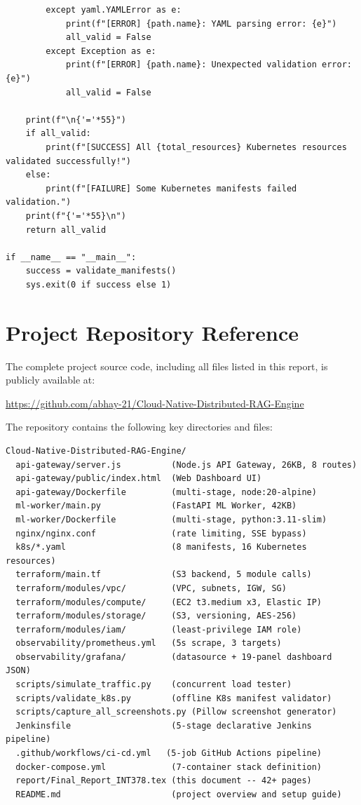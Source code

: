 \documentclass[12pt,a4paper]{report}
\begin{document}
\begin{lstlisting}
        except yaml.YAMLError as e:
            print(f"[ERROR] {path.name}: YAML parsing error: {e}")
            all_valid = False
        except Exception as e:
            print(f"[ERROR] {path.name}: Unexpected validation error: {e}")
            all_valid = False

    print(f"\n{'='*55}")
    if all_valid:
        print(f"[SUCCESS] All {total_resources} Kubernetes resources validated successfully!")
    else:
        print(f"[FAILURE] Some Kubernetes manifests failed validation.")
    print(f"{'='*55}\n")
    return all_valid

if __name__ == "__main__":
    success = validate_manifests()
    sys.exit(0 if success else 1)
\end{lstlisting}

\section{Project Repository Reference}

The complete project source code, including all files listed in this report,
is publicly available at:

\begin{center}
  \href{https://github.com/abhay-21/Cloud-Native-Distributed-RAG-Engine}{https://github.com/abhay-21/Cloud-Native-Distributed-RAG-Engine}
\end{center}

The repository contains the following key directories and files:

\begin{verbatim}
Cloud-Native-Distributed-RAG-Engine/
  api-gateway/server.js          (Node.js API Gateway, 26KB, 8 routes)
  api-gateway/public/index.html  (Web Dashboard UI)
  api-gateway/Dockerfile         (multi-stage, node:20-alpine)
  ml-worker/main.py              (FastAPI ML Worker, 42KB)
  ml-worker/Dockerfile           (multi-stage, python:3.11-slim)
  nginx/nginx.conf               (rate limiting, SSE bypass)
  k8s/*.yaml                     (8 manifests, 16 Kubernetes resources)
  terraform/main.tf              (S3 backend, 5 module calls)
  terraform/modules/vpc/         (VPC, subnets, IGW, SG)
  terraform/modules/compute/     (EC2 t3.medium x3, Elastic IP)
  terraform/modules/storage/     (S3, versioning, AES-256)
  terraform/modules/iam/         (least-privilege IAM role)
  observability/prometheus.yml   (5s scrape, 3 targets)
  observability/grafana/         (datasource + 19-panel dashboard JSON)
  scripts/simulate_traffic.py    (concurrent load tester)
  scripts/validate_k8s.py        (offline K8s manifest validator)
  scripts/capture_all_screenshots.py (Pillow screenshot generator)
  Jenkinsfile                    (5-stage declarative Jenkins pipeline)
  .github/workflows/ci-cd.yml   (5-job GitHub Actions pipeline)
  docker-compose.yml             (7-container stack definition)
  report/Final_Report_INT378.tex (this document -- 42+ pages)
  README.md                      (project overview and setup guide)
\end{verbatim}
\end{document}

